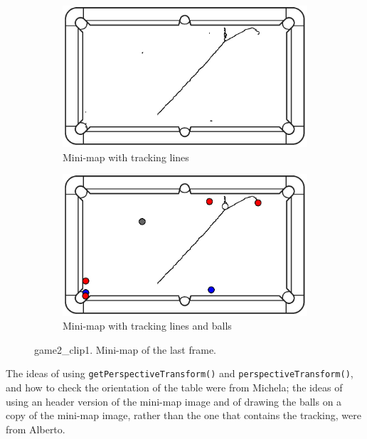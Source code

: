 \begin{figure}[H]
	\centering
	\begin{subfigure}[b]{0.35\textwidth}
		\centering
		\includegraphics[width=\textwidth]{images/Minimap/g2_c1minimap_with_track.jpg}
		\caption{Mini-map with tracking lines}
		\label{fig:game2_clip1_tracking}
	\end{subfigure}
	\begin{subfigure}[b]{0.35\textwidth}
		\centering
		\includegraphics[width=\textwidth]{images/Minimap/g2_c1_minimap_with_balls.jpg}
		\caption{Mini-map with tracking lines and balls}
		\label{fig:game2_clip1_balls}
	\end{subfigure}
	\caption{game2\_clip1. Mini-map of the last frame.}
	\label{fig:game2_clip1_balls_and_tracking}
\end{figure}

The ideas of using \texttt{getPerspectiveTransform()} and \texttt{perspectiveTransform()}, and how to check the orientation of the table were from Michela; the ideas of using an header version of the mini-map image and of drawing the balls on a copy of the mini-map image, rather than the one that contains the tracking, were from Alberto.
